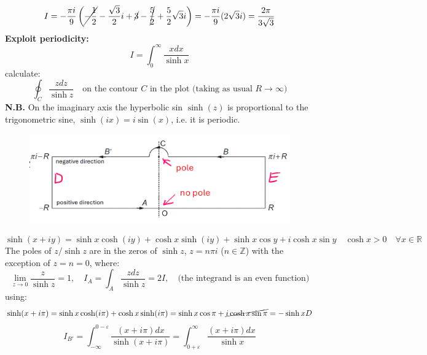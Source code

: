 \documentclass{article}
\begin{document}
\begin{equation}
    I = -\frac{\pi i }{9} \left( \cancel{-\frac12} - \frac{\sqrt{3}}{2}i + \cancel{3} -\cancel{\frac52} + \frac52 \sqrt{3}i \right) = -\frac{\pi i}{9} (2\sqrt{3}i) = \frac{2\pi}{3\sqrt{3}}
\end{equation}
\textbf{Exploit periodicity:}
\begin{equation}
    I = \int_0^\infty \frac{xdx}{\sinh{x}}
\end{equation}
calculate:
\begin{equation}
    \oint_C \frac{zdz}{\sinh{z}} \quad \text{on the contour $C$ in the plot (taking as usual $R \rightarrow \infty$)}
\end{equation}
\textbf{N.B.} On the imaginary axis the hyperbolic sin $\sinh(z)$ is proportional to the trigonometric sine, $\sinh(ix)=i \sin(x)$, i.e. it is periodic.

\begin{figure}[h]
    \centering
    \includegraphics[width=0.65\linewidth]{fig46.png}
\end{figure}

\begin{equation}
    \sinh(x + iy) = \sinh x \cosh(iy) + \cosh x \sinh(iy) + \sinh x \cos y + i \cosh x \sin y \quad \cosh x > 0 \quad \forall x \in \mathbb{R}
\end{equation}
The poles of $z/\sinh{z}$ are in the zeros of $\sinh{z}$, $z=n\pi i$ ($n \in \mathbb{Z}$) with the exception of $z=n=0$, where:
\begin{equation}
    \lim_{z \rightarrow 0} \frac{z}{\sinh{z}}=1, \quad I_A = \int_A \frac{zdz}{\sinh{z}} = 2I, \quad \text{(the integrand is an even function)}
\end{equation}
using:
\begin{equation}
    \sinh(x + i\pi) = \sinh x \cosh(i\pi) + \cosh x \sinh(i\pi) = \sinh x \cos \pi + \cancel{ i \cosh x \sin \pi} = - \sinh x D
\end{equation}
\begin{equation}
    I_{B'} = \int_{-\infty}^{0-\varepsilon} \frac{(x + i\pi)dx}{\sinh{(x+i\pi)}} = \int_{0+\varepsilon}^{\infty} \frac{(x+i\pi)dx}{\sinh{x}}
\end{equation}
\end{document}
